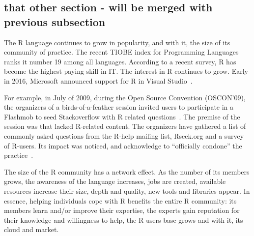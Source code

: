 \subsection{that other section - will be merged with previous subsection}


The R language continues to grow in popularity, and with it, the size of its community of practice. The recent TIOBE index for Programming Languages ranks it
number 19 among all languages.  According to a recent survey, R has become the highest paying skill in IT. The interest in R continues to grow.
Early in 2016, Microsoft announced support for R in Visual Studio~\cite{RMicrosoft2016}.

For example, in July of 2009, during the Open Source Convention (OSCON'09), the organizers of a birds-of-a-feather session invited users
to participate in a Flashmob to seed Stackoverflow with R related questions~\cite{OSCONRFlashMob2009}. The premise of the session was that \SO lacked R-related
content. The organizers have gathered a list of commonly asked questions from the R-help mailing list, Rseek.org and a survey of R-users. Its impact was
noticed, and \SO acknowledge to ``officially condone'' the practice~\cite{SOFlashMob2009}.

The size of the R community has a network effect. As the number of its members grows, the awareness of the language increases, jobs are created, available resources increase their size, depth and quality, new tools and libraries appear. In essence, helping individuals cope with R benefits the entire R community: its members learn and/or improve their expertise, the experts gain reputation for their knowledge and willingness to help, the R-users base grows and with it, its cloud and market.


